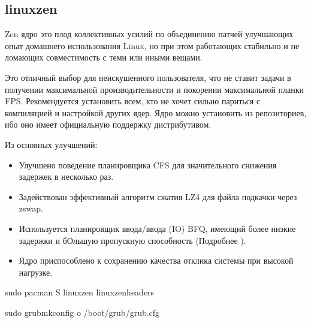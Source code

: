 \documentclass[letterpaper,10pt,russian,openany]{sphinxmanual}
\begin{document}
\ignorespaces 

\subsection{linux\sphinxhyphen{}zen}
\label{\detokenize{source/custom-kernels:linux-zen}}\label{\detokenize{source/custom-kernels:index-1}}\label{\detokenize{source/custom-kernels:id3}}
\sphinxAtStartPar
Zen ядро \sphinxhyphen{} это плод коллективных усилий по объединению патчей улучшающих опыт домашнего использования
Linux, но при этом работающих стабильно и не ломающих совместимость с теми или иными вещами.

\sphinxAtStartPar
Это отличный выбор для неискушенного пользователя, что не ставит задачи в получении максимальной
производительности и покорении максимальной планки FPS. Рекомендуется установить всем, кто
не хочет сильно париться с компиляцией и настройкой других ядер.
Ядро можно установить из репозиториев, ибо оно имеет официальную поддержку дистрибутивом.

\sphinxAtStartPar
Из основных улучшений:
\begin{itemize}
\item {} 
\sphinxAtStartPar
Улучшено поведение планировщика CFS для значительного снижения задержек в несколько раз.

\item {} 
\sphinxAtStartPar
Задействован эффективный алгоритм сжатия LZ4 для файла подкачки через zswap.

\item {} 
\sphinxAtStartPar
Используется планировщик ввода/ввода (IO) BFQ, имеющий более низкие задержки
и бОльшую пропускную способность (Подробнее \sphinxhyphen{} ).

\item {} 
\sphinxAtStartPar
Ядро приспособлено к сохранению качества отклика системы при высокой нагрузке.

\end{itemize}

\sphinxAtStartPar
{}

\begin{sphinxVerbatim}[commandchars=\\\{\}]
sudo pacman \PYGZhy{}S linux\PYGZhy{}zen linux\PYGZhy{}zen\PYGZhy{}headers

sudo grub\PYGZhy{}mkconfig \PYGZhy{}o /boot/grub/grub.cfg
\end{sphinxVerbatim}
\end{document}
